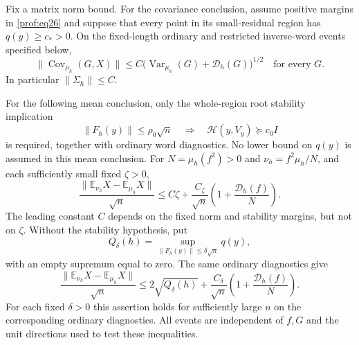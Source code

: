 \begin{proposition}
\label{prof:endpoint-posterior}
Fix a matrix norm bound. For the covariance conclusion, assume
positive margins in \eqref{prof:eq26} and suppose that every point
in its small-residual region has \(q(y)\ge c_*>0\).
On the fixed-length ordinary and restricted inverse-word events
specified below,
\[
 \|\operatorname{Cov}_{\mu_h}(G,X)\|
 \le C\bigl(\operatorname{Var}_{\mu_h}(G)+\mathcal D_h(G)\bigr)^{1/2}
 \quad\text{for every }G.
\]
In particular $\|\Sigma_h\|\le C$.

For the following mean conclusion, only the whole-region root
stability implication
\[
 \|F_h(y)\|\le\rho_0\sqrt n
 \quad\Longrightarrow\quad
 \mathcal H(y,V_y)\succeq c_0I
\]
is required, together with ordinary word diagnostics. No lower
bound on \(q(y)\) is assumed in this mean conclusion.
For $N=\mu_h(f^2)>0$ and $\nu_h=f^2\mu_h/N$, and each sufficiently
small fixed $\zeta>0$,
\begin{equation}\label{prof:eq27}
 \frac{\|\mathbb E_{\nu_h}X-\mathbb E_{\mu_h}X\|}{\sqrt n}
 \le C\zeta+\frac{C_\zeta}{\sqrt n}
                   \left(1+\frac{\mathcal D_h(f)}N\right).
\end{equation}
The leading constant \(C\) depends on the fixed norm and stability
margins, but not on \(\zeta\).
Without the stability hypothesis, put
\[
 Q_\delta(h)=\sup_{\|F_h(y)\|\le\delta\sqrt n}q(y),
\]
with an empty supremum equal to zero. The same ordinary diagnostics give
\begin{equation}\label{prof:eq27-coarse}
 \frac{\|\mathbb E_{\nu_h}X-\mathbb E_{\mu_h}X\|}{\sqrt n}
 \le 2\sqrt{Q_\delta(h)}+
       \frac{C_\delta}{\sqrt n}
                   \left(1+\frac{\mathcal D_h(f)}N\right).
\end{equation}
For each fixed $\delta>0$ this
assertion holds for sufficiently large $n$ on the corresponding
ordinary diagnostics.  All events are independent of $f,G$ and the
unit directions used to test these inequalities.
\end{proposition}

